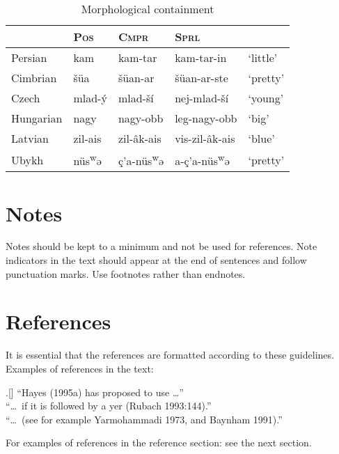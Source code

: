 \documentclass[times,linguex]{lsb}
\begin{document}
\begin{table}[h]
\centering
\caption{Morphological containment}	
\begin{tabular}{lllll}
 & \textsc{Pos} & \textsc{Cmpr} & \textsc{Sprl}\\
\hline 
Persian & kam & kam-tar & kam-tar-in & ‘little’\\
Cimbrian & šüa & šüan-ar & šüan-ar-ste & ‘pretty’ \\
Czech & mlad-ý & mlad-ší & nej-mlad-ší & ‘young’\\
Hungarian & nagy & nagy-obb & leg-nagy-obb & ‘big’\\
Latvian & zil-ais & zil-âk-ais & vis-zil-âk-ais & ‘blue’\\
Ubykh &  nüs\textsuperscript{w}ə & ç’a-nüs\textsuperscript{w}ə & a-ç’a-nüs\textsuperscript{w}ə & ‘pretty’ \\
\end{tabular}\label{tbl:table1}
\end{table}


\section{Notes}

Notes should be kept to a minimum and not be used for references. Note indicators in the text should appear at the end of sentences and follow punctuation marks. Use footnotes rather than endnotes.

\section{References}

It is essential that the references are formatted according to these guidelines. Examples of references in the text:

\ex.[]
 ``Hayes (1995a) has proposed to use \ldots''\\
``\ldots\ if it is followed by a yer (Rubach 1993:144).''\\
``\ldots\ (see for example Yarmohammadi 1973, and Baynham 1991).''

For examples of references in the reference section: see the next section.


\nocite{*} %
\end{document}
